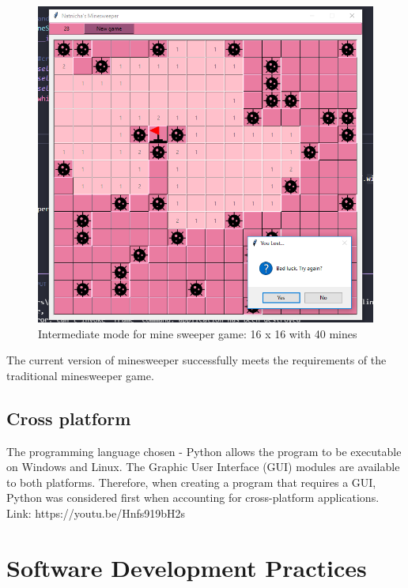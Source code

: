 \documentclass[12pt, a4]{report}
\begin{document}
		\begin{figure}[!h]
			\centering
			\includegraphics[scale=0.7]{game}
			\caption{Intermediate mode for mine sweeper game: 16 x 16 with 40 mines}
		\end{figure}
	\par The current  version of minesweeper successfully meets the requirements of the traditional minesweeper game. 
 
		\newpage
	\subsection{Cross platform}
	\par The programming language chosen - Python allows the program to be executable on Windows and Linux. The Graphic User Interface (GUI) modules are available to both platforms. Therefore, when creating a program that requires a GUI, Python was considered first when accounting for cross-platform applications. 
	Link: https://youtu.be/Hnfs919bH2s
	
	\section{Software Development Practices}
\end{document}
